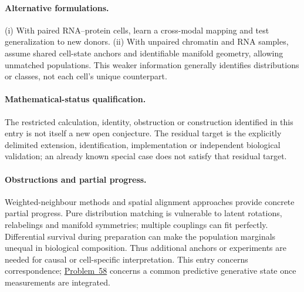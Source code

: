 \documentclass[11pt]{article}
\begin{document}
\paragraph{Alternative formulations.} (i) With paired RNA--protein cells, learn a cross-modal mapping and test generalization to new donors. (ii) With unpaired chromatin and RNA samples, assume shared cell-state anchors and identifiable manifold geometry, allowing unmatched populations. This weaker information generally identifies distributions or classes, not each cell's unique counterpart.
\paragraph{Mathematical-status qualification.} The restricted calculation, identity, obstruction or construction identified in this entry is not itself a new open conjecture. The residual target is the explicitly delimited extension, identification, implementation or independent biological validation; an already known special case does not satisfy that residual target.

\paragraph{Obstructions and partial progress.} Weighted-neighbour methods and spatial alignment approaches provide concrete partial progress. Pure distribution matching is vulnerable to latent rotations, relabelings and manifold symmetries; multiple couplings can fit perfectly. Differential survival during preparation can make the population marginals unequal in biological composition. Thus additional anchors or experiments are needed for causal or cell-specific interpretation. This entry concerns correspondence; \href{https://we-solve.github.io/problems/multi-omics-integration-26638fc0/}{Problem~58} concerns a common predictive generative state once measurements are integrated.
\end{document}
